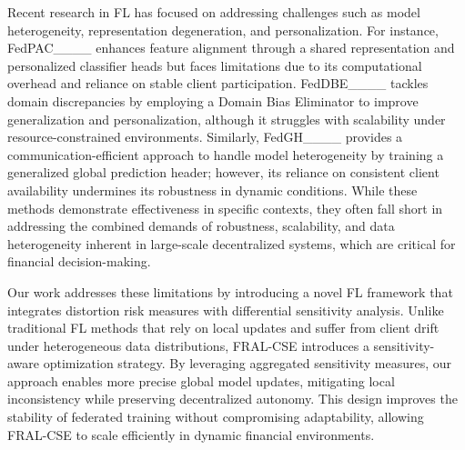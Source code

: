 Recent research in FL has focused on addressing challenges such as model heterogeneity, representation degeneration, and personalization. For instance, FedPAC____ enhances feature alignment through a shared representation and personalized classifier heads but faces limitations due to its computational overhead and reliance on stable client participation. FedDBE____ tackles domain discrepancies by employing a Domain Bias Eliminator to improve generalization and personalization, although it struggles with scalability under resource-constrained environments. Similarly, FedGH____ provides a communication-efficient approach to handle model heterogeneity by training a generalized global prediction header; however, its reliance on consistent client availability undermines its robustness in dynamic conditions. While these methods demonstrate effectiveness in specific contexts, they often fall short in addressing the combined demands of robustness, scalability, and data heterogeneity inherent in large-scale decentralized systems, which are critical for financial decision-making. 


Our work addresses these limitations by introducing a novel FL framework that integrates distortion risk measures with differential sensitivity analysis. Unlike traditional FL methods that rely on local updates and suffer from client drift under heterogeneous data distributions, FRAL-CSE introduces a sensitivity-aware optimization strategy. By leveraging aggregated sensitivity measures, our approach enables more precise global model updates, mitigating local inconsistency while preserving decentralized autonomy. This design improves the stability of federated training without compromising adaptability, allowing FRAL-CSE to scale efficiently in dynamic financial environments.